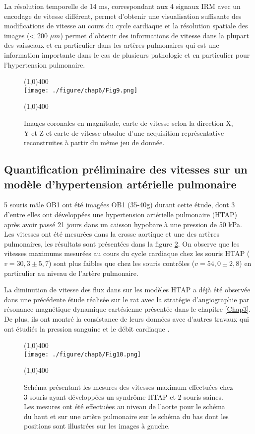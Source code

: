 La résolution temporelle de 14 ms, correspondant aux 4 signaux IRM avec un encodage de vitesse différent, permet d'obtenir une visualisation suffisante des modifications de vitesse au cours du cycle cardiaque et la résolution spatiale des images (< 200 $\mu m$) permet d'obtenir des informations de vitesse dans la plupart des vaisseaux et en particulier dans les artères pulmonaires qui est une information importante dans le cas de plusieurs pathologie et en particulier pour l'hypertension pulmonaire.

\begin{figure}[H]
\centering
\line(1,0){400} \\
\texttt{[image: ./figure/chap6/Fig9.png]}
\caption[Carte de vitesse]{\label{fig:CarteVitesse} Images coronales en magnitude, carte de vitesse selon la direction X, Y et Z et carte de vitesse absolue d'une acquisition représentative reconstruites à partir du même jeu de donnée.}
\line(1,0){400} \\ 
\end{figure}

\subsection{Quantification préliminaire des vitesses sur un modèle d'hypertension artérielle pulmonaire}

5 souris mâle OB1 ont été imagées OB1 (35-40g) durant cette étude, dont 3 d'entre elles ont développées une hypertension artérielle pulmonaire (HTAP) après avoir passé 21 jours dans un caisson hypobare à une pression de 50 kPa.
Les vitesses ont été mesurées dans la crosse aortique et une des artères pulmonaires, les résultats sont présentées dans la figure \ref{fig:CarteVitesse}. On observe que les vitesses maximums mesurées au cours du cycle cardiaque chez les souris HTAP ($v = 30,3 \pm 5,7$) sont plus faibles que chez les souris contrôles ($v = 54,0 \pm 2,8$) en particulier au niveau de l'artère pulmonaire.

La diminution de vitesse des flux dans sur les modèles HTAP a déjà été observée dans une précédente étude réalisée sur le rat \cite{Dumas2011effect} avec la stratégie d'angiographie par résonance magnétique dynamique cartésienne présentée dans le chapitre \ref{Chap3}. De plus, ils ont montré la consistance de leurs données avec d'autres travaux qui ont étudiés la pression sanguine et le débit cardiaque \cite{pozeg2003vivo,hessel2006characterization}.

\begin{figure}[H]
\centering
\line(1,0){400} \\
\texttt{[image: ./figure/chap6/Fig10.png]}
\caption[Vitesse HTAP]{\label{fig:CarteVitesse} Schéma présentant les mesures des vitesses maximum effectuées chez 3 souris ayant développées un syndrôme HTAP et 2 souris saines. Les mesures ont été effectuées au niveau de l'aorte pour le schéma du haut et sur une artère pulmonaire sur le schéma du bas dont les positions sont illustrées sur les images à gauche.}
\line(1,0){400} \\ 
\end{figure}

